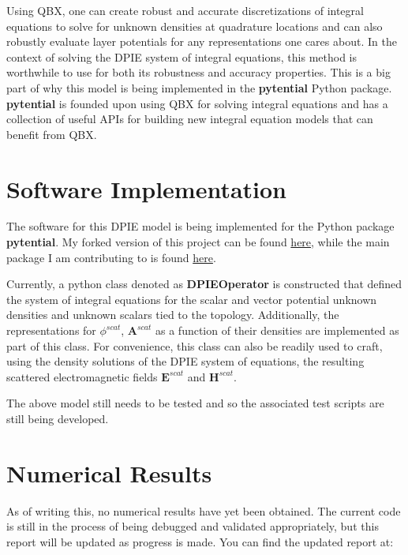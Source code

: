 \documentclass{article}[12pt]
\newcommand{\bvec}[1]{\boldsymbol{#1}}
\begin{document}
	Using QBX, one can create robust and accurate discretizations of integral equations to solve for unknown densities at quadrature locations and can also robustly evaluate layer potentials for any representations one cares about. In the context of solving the DPIE system of integral equations, this method is worthwhile to use for both its robustness and accuracy properties. This is a big part of why this model is being implemented in the \textbf{pytential} Python package. \textbf{pytential} is founded upon using QBX for solving integral equations and has a collection of useful APIs for building new integral equation models that can benefit from QBX.
	
	\section{Software Implementation}
	The software for this DPIE model is being implemented for the Python package \textbf{pytential}. My forked version of this project can be found \href{https://github.com/choward1491/pytential}{here}, while the main package I am contributing to is found \href{https://github.com/inducer/pytential}{here}.
	
	Currently, a python class denoted as \textbf{DPIEOperator} is constructed that defined the system of integral equations for the scalar and vector potential unknown densities and unknown scalars tied to the topology. Additionally, the representations for $\phi^{scat}$, $\bvec{A}^{scat}$ as a function of their densities are implemented as part of this class. For convenience, this class can also be readily used to craft, using the density solutions of the DPIE system of equations, the resulting scattered electromagnetic fields $\bvec{E}^{scat}$ and $\bvec{H}^{scat}$.
	
	The above model still needs to be tested and so the associated test scripts are still being developed.
	
	\section{Numerical Results}
	As of writing this, no numerical results have yet been obtained. The current code is still in the process of being debugged and validated appropriately, but this report will be updated as progress is made. You can find the updated report at: 
	


	\newpage	
\end{document}
